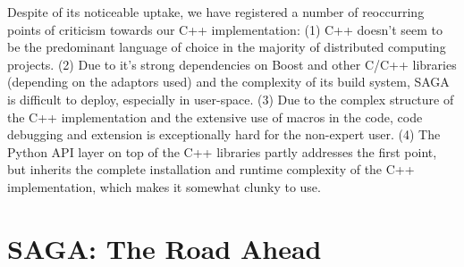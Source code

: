 \documentclass{article}
\newcommand{\B}[1]{\textbf{#1}}
\newcommand{\amnote}[1]{{\textcolor{green}{   \B{AndreM:  } #1 }}}
\newcommand{\alnote}[1]{{\textcolor{blue}{    \B{AndreL:  } #1 }}}
\newcommand{\amnote}[1]{}
\newcommand{\alnote}[1]{}
\begin{document}
   
  
   Despite of its noticeable uptake, we have registered a number of
   reoccurring points of criticism towards our C++ implementation:
   (1) C++ doesn't seem to be the predominant language of choice
   in the majority of distributed computing projects.
   (2) Due to it's strong dependencies on Boost and other C/C++
   libraries (depending on the adaptors used) and the complexity of its
   build system, SAGA is difficult to deploy, especially in user-space.
   (3) Due to the complex structure of the C++ implementation and the
   extensive use of macros in the code, code debugging and extension
   is exceptionally hard for the non-expert user.
   (4) The Python API layer on top of the C++ libraries partly
   addresses the first point, but inherits the complete installation and
   runtime complexity of the C++ implementation, which makes it somewhat
   clunky to use.




\section{SAGA: The Road Ahead}
\label{sec:road}
\end{document}
